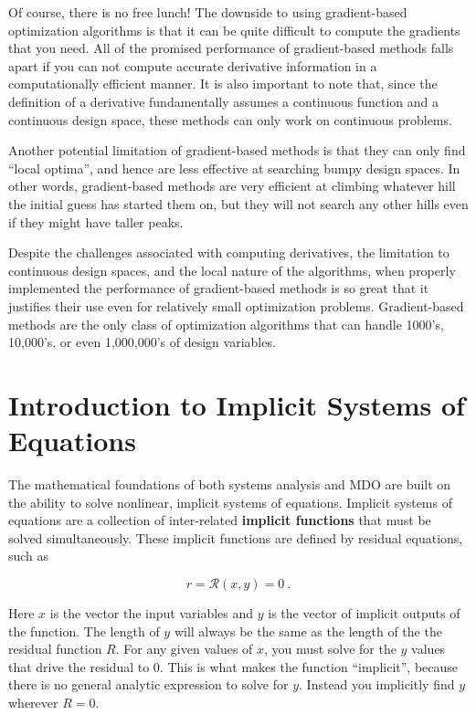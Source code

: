 \documentclass[conf]{new-aiaa}
\begin{document}
            Of course, there is no free lunch! The downside to using gradient-based optimization algorithms is that it can be quite difficult to compute the gradients that you need. 
            All of the promised performance of gradient-based methods falls apart if you can not compute accurate derivative information in a computationally efficient manner. 
            It is also important to note that, since the definition of a derivative fundamentally assumes a continuous function and a continuous design space, these methods can only work on continuous problems. 

            Another potential limitation of gradient-based methods is that they can only find ``local optima'', and hence are less effective at searching bumpy design spaces. 
            In other words, gradient-based methods are very efficient at climbing whatever hill the initial guess has started them on, but they will not search any other hills even if they might have taller peaks. 

            Despite the challenges associated with computing derivatives, the limitation to continuous design spaces, and the local nature of the algorithms, when properly implemented the performance of gradient-based methods is so great that it justifies their use even for relatively small optimization problems. 
            Gradient-based methods are the only class of optimization algorithms that can handle 1000's, 10,000's, or even 1,000,000's of design variables. 


\section{Introduction to Implicit Systems of Equations}

The mathematical foundations of both systems analysis and MDO are built on the ability to solve nonlinear, implicit systems of equations. 
Implicit systems of equations are a collection of inter-related \textbf{implicit functions} that must be solved simultaneously. 
These implicit functions are defined by residual equations, such as 

    \begin{equation} 
    r = \mathcal{R}(x, y) = 0 \ . 
    \label{equation}
    \end{equation}

Here $x$ is the vector the input variables and $y$ is the vector of implicit outputs of the function. 
The length of $y$ will always be the same as the length of the the residual function $R$.
For any given values of $x$, you must solve for the $y$ values that drive the residual to 0. 
This is what makes the function ``implicit'', because there is no general analytic expression to solve for $y$. 
Instead you implicitly find $y$ wherever $R=0$. 
\end{document}
